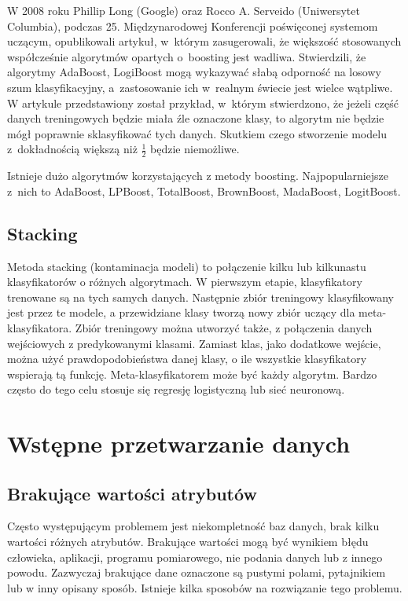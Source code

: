W 2008 roku Phillip Long (Google) oraz Rocco A. Serveido (Uniwersytet Columbia), podczas 25. Międzynarodowej Konferencji poświęconej systemom uczącym, opublikowali artykuł, w którym zasugerowali, że większość stosowanych współcześnie algorytmów opartych o boosting jest wadliwa. Stwierdzili, że algorytmy AdaBoost, LogiBoost mogą wykazywać słabą odporność na losowy szum klasyfikacyjny, a zastosowanie ich w realnym świecie jest wielce wątpliwe. W artykule przedstawiony został przykład, w którym stwierdzono, że jeżeli część danych treningowych będzie miała źle oznaczone klasy, to algorytm nie będzie mógł poprawnie sklasyfikować tych danych. Skutkiem czego stworzenie modelu z dokładnością większą niż $\frac{1}{2}$ będzie niemożliwe. \par
Istnieje dużo algorytmów korzystających z metody boosting. Najpopularniejsze z nich to AdaBoost, LPBoost, TotalBoost, BrownBoost, MadaBoost, LogitBoost.
\subsection{Stacking}
Metoda stacking (kontaminacja modeli) to połączenie kilku lub kilkunastu klasyfikatorów o różnych algorytmach. W pierwszym etapie, klasyfikatory trenowane są na tych samych danych. Następnie zbiór treningowy klasyfikowany jest przez te modele, a przewidziane klasy tworzą nowy zbiór uczący dla meta-klasyfikatora. Zbiór treningowy można utworzyć także, z połączenia danych wejściowych z predykowanymi klasami. Zamiast klas, jako dodatkowe wejście, można użyć prawdopodobieństwa danej klasy, o ile wszystkie klasyfikatory wspierają tą funkcję. Meta-klasyfikatorem może być każdy algorytm. Bardzo często do tego celu stosuje się regresję logistyczną lub sieć neuronową. 
\section{Wstępne przetwarzanie danych}
\subsection{Brakujące wartości atrybutów}
Często występującym problemem jest niekompletność baz danych, brak kilku wartości różnych atrybutów. Brakujące wartości mogą być wynikiem błędu człowieka, aplikacji, programu pomiarowego, nie podania danych lub z innego powodu. Zazwyczaj brakujące dane oznaczone są pustymi polami, pytajnikiem lub w inny opisany sposób. Istnieje kilka sposobów na rozwiązanie tego problemu.
